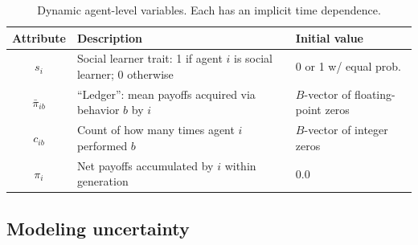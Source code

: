 \documentclass[letterpaper,11.5pt]{scrartcl}
\begin{document}
\vspace{2em}

\begin{table}[h]
    \caption{Dynamic agent-level variables. Each has an implicit time dependence.}
    \label{tab:modelParameters}
    \centering \hspace{-3em}
    \begin{tabular}{cp{4.0in}l} \toprule

        Attribute & Description & Initial value \\ 

        \midrule  

        $s_i$  & Social learner trait: 1 if agent $i$ is social learner; 0 otherwise & 0
        or 1 w/ equal prob. \\

        $\bar\pi_{ib}$ & ``Ledger'': mean payoffs acquired via behavior $b$ by $i$ 
                       & $B$-vector of floating-point zeros \\

        $c_{ib}$ & Count of how many times agent $i$ performed $b$ 
              & $B$-vector of integer zeros \\

        $\pi_i$ & Net payoffs accumulated by $i$ within generation
                                & 0.0 \\
        \bottomrule
    \end{tabular}
\end{table}

\vspace{2em}




\subsection{Modeling uncertainty}
\end{document}
